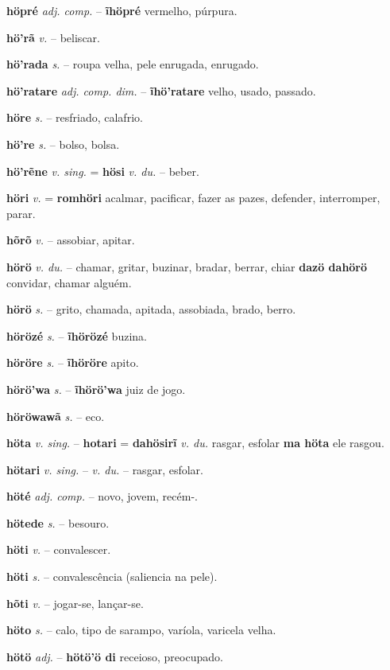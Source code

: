 \textbf{höpré} \textit{adj. comp.} -- \textbf{ĩhöpré} vermelho, púrpura.

\textbf{hö'rã} \textit{v.} -- beliscar.

\textbf{hö'rada} \textit{s.} -- roupa velha, pele enrugada, enrugado.

\textbf{hö'ratare} \textit{adj. comp. dim.} -- \textbf{ĩhö'ratare} velho, usado, passado.

\textbf{höre} \textit{s.} -- resfriado, calafrio.

\textbf{hö're} \textit{s.} -- bolso, bolsa.

\textbf{hö'rẽne} \textit{v. sing.} = \textbf{hösi} \textit{v. du.} -- beber.

\textbf{höri} \textit{v.} = \textbf{romhöri} acalmar, pacificar, fazer as pazes, defender, interromper, parar.

\textbf{hõrõ} \textit{v.} -- assobiar, apitar.

\textbf{hörö} \textit{v. du.} -- chamar, gritar, buzinar, bradar, berrar, chiar  \textbf{dazö dahörö} convidar, chamar alguém.

\textbf{hörö} \textit{s.} -- grito, chamada, apitada, assobiada, brado, berro.

\textbf{hörözé} \textit{s.} -- \textbf{ĩhörözé} buzina.

\textbf{höröre} \textit{s.} -- \textbf{ĩhöröre} apito.

\textbf{hörö'wa} \textit{s.} -- \textbf{ĩhörö'wa} juiz de jogo.

\textbf{höröwawã} \textit{s.} -- eco.

\textbf{höta} \textit{v. sing.} -- \textbf{hotari} = \textbf{dahösirĩ} \textit{v. du.} rasgar, esfolar  \textbf{ma höta} ele rasgou.

\textbf{hötari} \textit{v. sing.} -- \textit{v. du.} -- rasgar, esfolar.

\textbf{höté} \textit{adj. comp.} -- novo, jovem, recém-.

\textbf{hötede} \textit{s.} -- besouro.

\textbf{höti} \textit{v.} -- convalescer.

\textbf{höti} \textit{s.} -- convalescência (saliencia na pele).

\textbf{hõti} \textit{v.} -- jogar-se, lançar-se.

\textbf{höto} \textit{s.} -- calo, tipo de sarampo, varíola, varicela velha.

\textbf{hötö} \textit{adj.} -- \textbf{hötö'ö di} receioso, preocupado.

